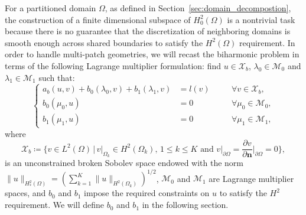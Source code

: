 For a partitioned domain $\Omega$, as defined in Section~\ref{sec:domain_decompostion}, the construction of a finite dimensional subspace of $H^2_0(\Omega)$ is a nontrivial task because there is no guarantee that the discretization of neighboring domains is smooth enough across shared boundaries to satisfy the $H^2(\Omega)$ requirement. In order to handle multi-patch geometries, we will recast the biharmonic problem in terms of the following Lagrange multiplier formulation: find $u\in{\mathcal{X}_b}$, $\lambda_0\in{\mathcal{M}_0}$ and $\lambda_1\in{\mathcal{M}_1}$ such that:
\begin{equation}
  \left\{\begin{alignedat}{2}
    a_b(u,v)+b_0(\lambda_0,v)+b_1(\lambda_1,v)&=l(v)\quad&&\forall v\in{\mathcal{X}_b},\\
    b_0(\mu_0,u)&=0 \quad&&\forall \mu_0\in{\mathcal{M}_0},\\
    b_1(\mu_1,u)&=0 \quad&&\forall \mu_1\in{\mathcal{M}_1},
  \end{alignedat}\right.
\end{equation}
where
\begin{equation}
  \mathcal{X}_b\coloneq\{v\in{}L^2(\Omega)\,\vert\,{}v\vert_{\Omega_k}\in{}H^2(\Omega_k),\,{}1\leq{}k\leq{}K\text{  and }v\vert_{\partial{}\Omega}=\frac{\partial{}v}{\partial{\mathbf{n}}}\vert_{\partial{}\Omega}=0\},
\end{equation}
is an unconstrained broken Sobolev space endowed with the norm $\|u\|_{H^2_*(\Omega)}=\left(\sum_{k=1}^K \|u\|_{H^2(\Omega_k)}\right)^{1/2}$, $\mathcal{M}_0$ and $\mathcal{M}_1$ are Lagrange multiplier spaces, and $b_0$ and $b_1$ impose the required constraints on $u$ to satisfy the $H^2$ requirement. We will define $b_0$ and $b_1$ in the following section.

